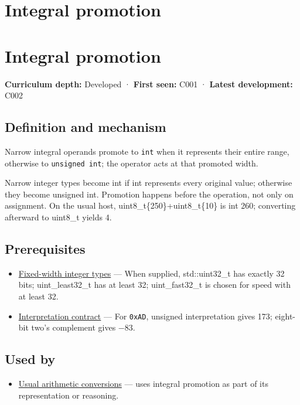 \hypertarget{appendix-45303d03796a}{}
\section*{Integral promotion}
\section{Integral promotion}\label{integral-promotion}

\textbf{Curriculum depth:} Developed · \textbf{First seen:} C001 · \textbf{Latest development:} C002

\subsection{Definition and mechanism}\label{definition-and-mechanism}

Narrow integral operands promote to \texttt{int} when it represents their entire range, otherwise to \texttt{unsigned\ int}; the operator acts at that promoted width.

Narrow integer types become int if int represents every original value; otherwise they become unsigned int. Promotion happens before the operation, not only on assignment. On the usual host, uint8\_t\{250\}+uint8\_t\{10\} is int 260; converting afterward to uint8\_t yields 4.

\subsection{Prerequisites}\label{prerequisites}

\begin{itemize}
\tightlist
\item
  \hyperref[appendix-cc04044b5782]{Fixed-width integer types} --- When supplied, std::uint32\_t has exactly 32 bits; uint\_least32\_t has at least 32; uint\_fast32\_t is chosen for speed with at least 32.
\item
  \hyperref[appendix-f414bd4ed05c]{Interpretation contract} --- For \texttt{0xAD}, unsigned interpretation gives 173; eight-bit two's complement gives −83.
\end{itemize}

\subsection{Used by}\label{used-by}

\begin{itemize}
\tightlist
\item
  \hyperref[appendix-5e2d663adf7f]{Usual arithmetic conversions} --- uses integral promotion as part of its representation or reasoning.
\end{itemize}

